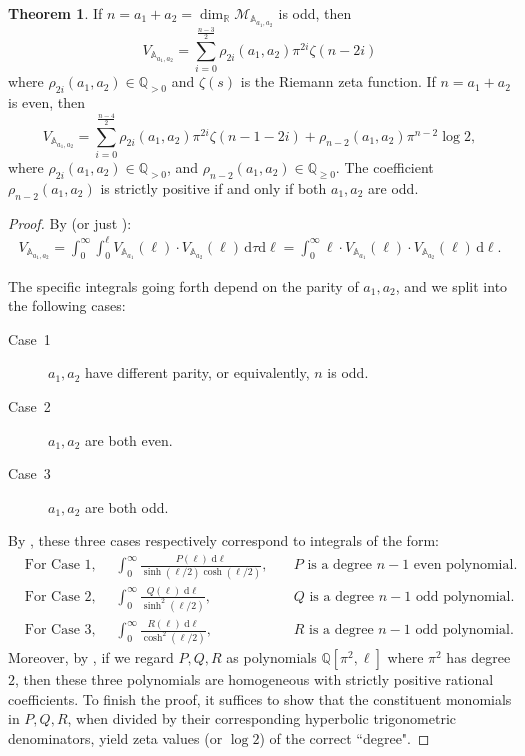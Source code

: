 \documentclass{amsart}
\newcommand{\QQ}{\mathbb{Q}}
\theoremstyle{definition}
\newtheorem{theorem}[proposition]{Theorem}
\begin{document}
\begin{theorem}
\label{thm:vol-biannuli}
If $n=a_1+a_2=\dim_{\mathbb{R}}\mathcal{M}_{\mathbb{A}_{a_1,a_2}}$ is odd, then
\[
V_{\mathbb{A}_{a_1,a_2}} =\sum_{i=0}^{\frac{n-3}{2}} \rho_{2i}(a_1,a_2) \pi^{2i}\zeta(n-2i)
\]
where $\rho_{2i}(a_1,a_2) \in \QQ_{>0}$ and $\zeta(s)$ is the Riemann zeta function. If $n=a_1+a_2$ is even, then
\[
V_{\mathbb{A}_{a_1,a_2}} = \sum_{i=0}^{\frac{n-4}{2}} \rho_{2i}(a_1,a_2) \pi^{2i}\zeta(n-1-2i)+ \rho_{n-2}(a_1,a_2)\pi^{n-2}\log2,
\]
where $\rho_{2i}(a_1,a_2) \in \QQ_{>0}$, and $\rho_{n-2}(a_1,a_2) \in \QQ_{\geqslant 0}$. The coefficient $\rho_{n-2}(a_1,a_2)$ is strictly positive if and only if both $a_1,a_2$ are odd.
\end{theorem}


\begin{proof}
By \cite[Lemma~2.6]{chekhov2024} (or just ):
\begin{align}
\label{eq:int-vol-bi-annulus}
V_{\mathbb{A}_{a_1,a_2}} 
= \int_0^\infty\int_0^\ell 
V_{\mathbb{A}_{a_1}}(\ell)
\cdot V_{\mathbb{A}_{a_2}}(\ell)
\,\mathrm{d}\tau \mathrm{d}\ell 
=\int_0^\infty 
\ell
\cdot V_{\mathbb{A}_{a_1}}(\ell)
\cdot V_{\mathbb{A}_{a_2}}(\ell) 
\,\mathrm{d}\ell.
\end{align}

The specific integrals going forth depend on the parity of $a_1,a_2$, and we split into the following cases: 
\begin{description}
    \item[Case~1] $a_1,a_2$ have different parity, or equivalently, $n$ is odd. 
    \item[Case~2] $a_1,a_2$ are both even.
    \item[Case~3] $a_1,a_2$ are both odd.
\end{description}
By , these three cases respectively correspond to integrals of the form:
\begin{align*}
&\text{For Case~1,}\quad
&\int_0^\infty
\frac{P(\ell)\;\mathrm{d}\ell}{\sinh(\ell/2)\cosh(\ell/2)},&
\quad\text{$P$ is a degree $n-1$ even polynomial.}\\
&\text{For Case~2,}\quad
&\int_0^\infty
\frac{Q(\ell)\;\mathrm{d}\ell}{\sinh^2 (\ell/2)},&
\quad\text{$Q$ is a degree $n-1$ odd polynomial.}\\
&\text{For Case~3,}
&\int_0^\infty
\frac{R(\ell)\;\mathrm{d}\ell}
{\cosh^2 (\ell/2)},&
\quad\text{$R$ is a degree $n-1$ odd polynomial}.
\end{align*}
Moreover, by , if we regard $P,Q,R$ as polynomials $\mathbb{Q}[\pi^2,\ell]$ where $\pi^2$ has degree $2$, then these three polynomials are homogeneous with strictly positive rational coefficients. To finish the proof, it suffices to show that the constituent monomials in $P,Q,R$, when divided by their corresponding hyperbolic trigonometric denominators, yield zeta values (or $\log2$) of the correct ``degree".\medskip


\end{proof}
\end{document}
